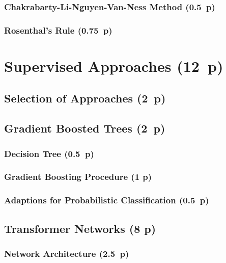 \subsubsection{Chakrabarty-Li-Nguyen-Van-Ness
  Method (0.5~p)}\label{chakarabarty-li-nguyen-van-ness-method}


\subsubsection{Rosenthal's Rule (0.75~p)}\label{rosenthals-rule}

\newpage
\section{Supervised Approaches (12~p)}\label{supervised-approaches}

\subsection{Selection of Approaches (2~p)}\label{selection-of-approaches}

\subsection{Gradient Boosted Trees (2~p)}\label{gradient-boosted-trees}

\subsubsection{Decision Tree (0.5~p)}\label{decision-tree}

\subsubsection{Gradient Boosting
  Procedure (1 p)}\label{gradient-boosting-procedure}

\subsubsection{Adaptions for Probabilistic
  Classification (0.5~p)}\label{adaptions-for-probablistic-classification}

\subsection{Transformer Networks (8 p)}\label{transformer-networks}

\subsubsection{Network Architecture (2.5~p)}\label{network-architecture}

